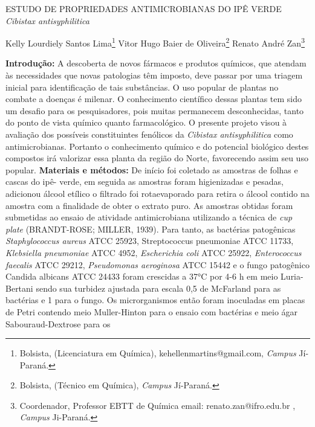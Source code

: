 \documentclass[article,12pt,onesidea,4paper,english,brazil]{abntex2}
\begin{document}
	
	
	\frenchspacing 
	
	\begin{center}
		\LARGE ESTUDO DE PROPRIEDADES ANTIMICROBIANAS DO IPÊ VERDE \textit{Cibistax
		antisyphilitica}
		
		\normalsize
		Kelly Lourdiely Santos Lima\footnote{Bolsista, (Licenciatura em Química), kehellenmartins@gmail.com, \textit{Campus} Jí-Paraná.} 
		Vitor Hugo Baier de Oliveira\footnote{Bolsista, (Técnico em Química), \textit{Campus} Jí-Paraná.} 
		Renato André Zan\footnote{Coordenador, Professor EBTT de Química email: renato.zan@ifro.edu.br , \textit{Campus} Ji-Paraná.} 
	\end{center}
	
	\noindent \textbf{Introdução:} A descoberta de novos fármacos e produtos químicos, que atendam às
	necessidades que novas patologias têm imposto, deve passar por uma triagem
	inicial para identificação de tais substâncias. O uso popular de plantas no combate a
	doenças é milenar. O conhecimento científico dessas plantas tem sido um desafio
	para os pesquisadores, pois muitas permanecem desconhecidas, tanto do ponto de
	vista químico quanto farmacológico. O presente projeto visou à avaliação dos
	possíveis constituintes fenólicos da \textit{Cibistax antisyphilitica} como antimicrobianas.
	Portanto o conhecimento químico e do potencial biológico destes compostos irá
	valorizar essa planta da região do Norte, favorecendo assim seu uso popular.
	\textbf{Materiais e métodos:} De início foi coletado as amostras de folhas e cascas do ipê-
	verde, em seguida as amostras foram higienizadas e pesadas, adicionou álcool
	etílico o filtrado foi rotaevaporado para retira o álcool contido na amostra com a
	finalidade de obter o extrato puro. As amostras obtidas foram submetidas ao ensaio
	de atividade antimicrobiana utilizando a técnica de \textit{cup plate} (BRANDT-ROSE;
	MILLER, 1939). Para tanto, as bactérias patogênicas \textit{Staphylococcus aureus} ATCC
	25923, Streptococcus pneumoniae ATCC 11733, \textit{Klebsiella pneumoniae} ATCC
	4952, \textit{Escherichia coli} ATCC 25922, \textit{Enterococcus faecalis} ATCC 29212,
	\textit{Pseudomonas aeroginosa} ATCC 15442 e o fungo patogênico Candida albicans
	ATCC 24433 foram crescidas a 37°C por 4-6 h em meio Luria-Bertani sendo sua
	turbidez ajustada para escala 0,5 de McFarland para as bactérias e 1 para o fungo.
	Os microrganismos então foram inoculadas em placas de Petri contendo meio
	Muller-Hinton para o ensaio com bactérias e meio ágar Sabouraud-Dextrose para os
\end{document}
